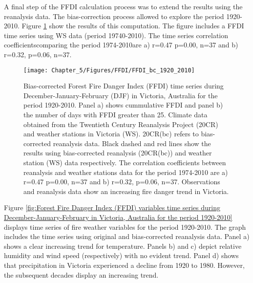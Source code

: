 A final step of the FFDI calculation process was to extend the results
using the reanalysis data. The bias-correction process allowed to
explore the period 1920-2010. Figure \ref{fig:Bias-corrected Forest Fire Danger Index (FFDI) time series during December-January-February in Victoria, Australia for the period 1920-2010}
show the results of this computation. The figure includes a FFDI time
series using WS data (period 19740-2010). The time series correlation
coefficients\textemdash comparing the period 1974-2010\textemdash are
a) r=0.47 p=0.00, n=37 and b) r=0.32, p=0.06, n=37.

\begin{figure}[h]
\noindent \begin{centering}
\texttt{[image: Chapter\_5/Figures/FFDI/FFDI\_bc\_1920\_2010]}
\par\end{centering}

\caption[Bias-corrected Forest Fire Danger Index (FFDI) time series during
December-January-February (DJF) in Victoria, Australia for the period
1920-2010]{Bias-corrected Forest Fire Danger Index (FFDI) time series during
December-January-February (DJF) in Victoria, Australia for the period
1920-2010. Panel a) shows cummulative FFDI and panel b) the number
of days with FFDI greater than 25. Climate data obtained from the
Twentieth Century Reanalysis Project (20CR) and weather stations
in Victoria (WS). 20CR(bc) refers to bias-corrected reanalysis data.
Black dashed and red lines show the results using bias-corrected reanalysis
(20CR(bc)) and weather station (WS) data respectively. The correlation
coefficients between reanalysis and weather stations data for the period
1974-2010 are a) r=0.47 p=0.00, n=37 and b) r=0.32, p=0.06, n=37.
Observations and reanalysis data show an increasing fire danger trend
in Victoria. \label{fig:Bias-corrected Forest Fire Danger Index (FFDI) time series during December-January-February in Victoria, Australia for the period 1920-2010}}
\end{figure}


Figure \ref{fig:Forest Fire Danger Index (FFDI) variables time series during December-January-February in Victoria, Australia for the period 1920-2010}
displays time series of fire weather variables for the period 1920-2010.
The graph includes the time series using original and bias-corrected
reanalysis data. Panel a) shows a clear increasing trend for temperature.
Panels b) and c) depict relative humidity and wind speed (respectively)
with no evident trend. Panel d) shows that precipitation in Victoria
experienced a decline from 1920 to 1980. However, the subsequent decades
display an increasing trend. 

